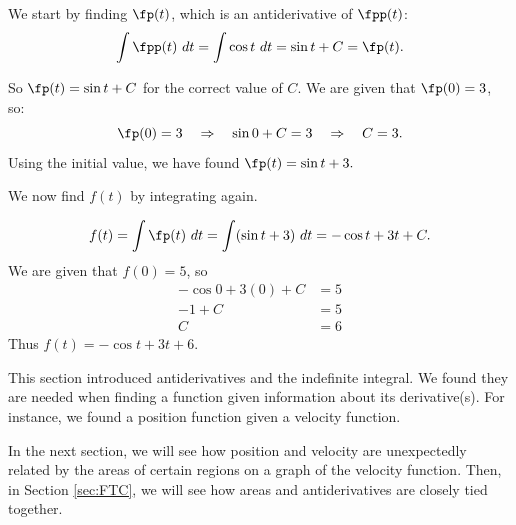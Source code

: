 \begin{solution}
{We start by finding $\fp(t)$, which is an antiderivative of $\fpp(t)$:
		$$\int \fpp(t)\ dt = \int \cos t\ dt = \sin t + C = \fp(t).$$
		
		So $\fp(t) = \sin t+C$ for the correct value of $C$. We are given that $\fp(0) = 3$, so:
		$$\fp(0) = 3 \quad \Rightarrow \quad \sin 0+C = 3 \quad \Rightarrow \quad C=3.$$
		Using the initial value, we have found $\fp(t) = \sin t+ 3.$
		
We now find $f(t)$ by integrating again.

$$f(t)=\int \fp(t) \ dt = \int (\sin t+3)\ dt = -\cos t + 3t + C.$$ 
We are given that $f(0) = 5$, so
\begin{align*}
-\cos 0 + 3(0) + C &= 5 \\
-1 + C &= 5\\
C &= 6
\end{align*}
 Thus $f(t) = -\cos t + 3t + 6$.
}
\end{solution}


This section introduced antiderivatives and the indefinite integral. We found they are needed when finding a function given information about its derivative(s). For instance, we found a position function given a velocity function.

In the next section, we will see how position and velocity are unexpectedly related by the areas of certain regions on a graph of the velocity function. Then, in Section \ref{sec:FTC}, we will see how areas and antiderivatives are closely tied together.

